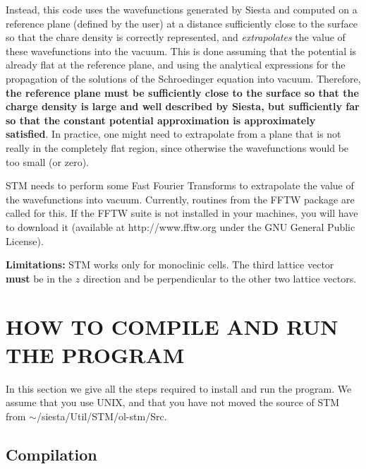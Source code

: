 Instead, this code uses the wavefunctions generated by {\sc Siesta}
and computed on a reference plane (defined by the user)
at a distance sufficiently close to the surface so that the
chare density is correctly represented, and {\em extrapolates}
the value of these wavefunctions into the vacuum. This is done assuming
that the potential is already flat at the reference plane,
and using the analytical expressions for the propagation of the
solutions of the Schroedinger equation into vacuum. Therefore, {\bf the
reference plane must be sufficiently close to the surface
so that the charge density is large and well described by {\sc Siesta},
but sufficiently far so that the constant potential approximation
is approximately satisfied}. In practice, one might need to extrapolate from
a plane that is not really in the completely flat region, since
otherwise the wavefunctions would be too small (or zero).

{\sc STM} needs to perform some Fast Fourier Transforms to
extrapolate the value of the wavefunctions into vacuum.
Currently, routines from the FFTW package are called for this.
If the FFTW suite is not installed in your machines, you
will have to download it (available at http://www.fftw.org
under the GNU General Public License).

\noindent
{\bf Limitations:} {\sc STM} works only for monoclinic cells.
The third lattice vector {\bf must} be in the $z$ direction
and be perpendicular to the other two lattice vectors.

\section{HOW TO COMPILE AND RUN THE PROGRAM}

In this section we give all the steps required to install and run the
program.  We assume that you use UNIX, and that you have not moved the
source of {\sc STM} from $\sim$/siesta/Util/STM/ol-stm/Src.

\subsection{Compilation}

